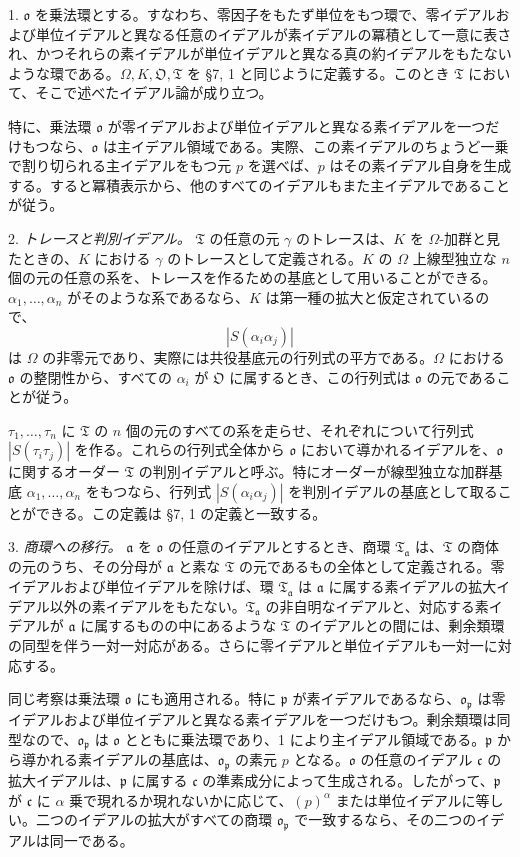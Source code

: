 \documentclass[11pt]{article}
\providecommand{\mT}{\mathfrak{T}}
\providecommand{\mO}{\mathfrak{O}}
\providecommand{\mo}{\mathfrak{o}}
\providecommand{\ma}{\mathfrak{a}}
\providecommand{\mc}{\mathfrak{c}}
\providecommand{\mpideal}{\mathfrak{p}}
\begin{document}
1. $\mo$ を乗法環とする。すなわち、零因子をもたず単位をもつ環で、零イデアルおよび単位イデアルと異なる任意のイデアルが素イデアルの冪積として一意に表され、かつそれらの素イデアルが単位イデアルと異なる真の約イデアルをもたないような環である。$\Omega,K,\mO,\mT$ を \S 7, 1 と同じように定義する。このとき $\mT$ において、そこで述べたイデアル論が成り立つ。

特に、乗法環 $\mo$ が零イデアルおよび単位イデアルと異なる素イデアルを一つだけもつなら、$\mo$ は主イデアル領域である。実際、この素イデアルのちょうど一乗で割り切られる主イデアルをもつ元 $p$ を選べば、$p$ はその素イデアル自身を生成する。すると冪積表示から、他のすべてのイデアルもまた主イデアルであることが従う。

2. \emph{トレースと判別イデアル。} $\mT$ の任意の元 $\gamma$ のトレースは、$K$ を $\Omega$-加群と見たときの、$K$ における $\gamma$ のトレースとして定義される。$K$ の $\Omega$ 上線型独立な $n$ 個の元の任意の系を、トレースを作るための基底として用いることができる。$\alpha_1,\ldots,\alpha_n$ がそのような系であるなら、$K$ は第一種の拡大と仮定されているので、
\[
        |S(\alpha_i\alpha_j)|
\]
は $\Omega$ の非零元であり、実際には共役基底元の行列式の平方である。$\Omega$ における $\mo$ の整閉性から、すべての $\alpha_i$ が $\mO$ に属するとき、この行列式は $\mo$ の元であることが従う。

$\tau_1,\ldots,\tau_n$ に $\mT$ の $n$ 個の元のすべての系を走らせ、それぞれについて行列式 $|S(\tau_i\tau_j)|$ を作る。これらの行列式全体から $\mo$ において導かれるイデアルを、$\mo$ に関するオーダー $\mT$ の判別イデアルと呼ぶ。特にオーダーが線型独立な加群基底 $\alpha_1,\ldots,\alpha_n$ をもつなら、行列式 $|S(\alpha_i\alpha_j)|$ を判別イデアルの基底として取ることができる。この定義は \S 7, 1 の定義と一致する。

3. \emph{商環への移行。} $\ma$ を $\mo$ の任意のイデアルとするとき、商環 $\mT_\ma$ は、$\mT$ の商体の元のうち、その分母が $\ma$ と素な $\mT$ の元であるもの全体として定義される。零イデアルおよび単位イデアルを除けば、環 $\mT_\ma$ は $\ma$ に属する素イデアルの拡大イデアル以外の素イデアルをもたない。$\mT_\ma$ の非自明なイデアルと、対応する素イデアルが $\ma$ に属するものの中にあるような $\mT$ のイデアルとの間には、剰余類環の同型を伴う一対一対応がある。さらに零イデアルと単位イデアルも一対一に対応する。

同じ考察は乗法環 $\mo$ にも適用される。特に $\mpideal$ が素イデアルであるなら、$\mo_\mpideal$ は零イデアルおよび単位イデアルと異なる素イデアルを一つだけもつ。剰余類環は同型なので、$\mo_\mpideal$ は $\mo$ とともに乗法環であり、1 により主イデアル領域である。$\mpideal$ から導かれる素イデアルの基底は、$\mo_\mpideal$ の素元 $p$ となる。$\mo$ の任意のイデアル $\mc$ の拡大イデアルは、$\mpideal$ に属する $\mc$ の準素成分によって生成される。したがって、$\mpideal$ が $\mc$ に $\alpha$ 乗で現れるか現れないかに応じて、$(p)^\alpha$ または単位イデアルに等しい。二つのイデアルの拡大がすべての商環 $\mo_\mpideal$ で一致するなら、その二つのイデアルは同一である。
\end{document}
